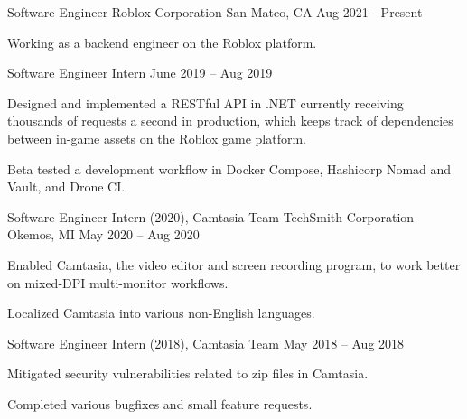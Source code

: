 \documentclass[]{awesome-cv}
\begin{document}
	\cventry
	{Software Engineer}
	{Roblox Corporation}
	{San Mateo, CA}
	{Aug 2021 - Present}
	{\begin{cvitems}
		\item{Working as a backend engineer on the Roblox platform.}
	\end{cvitems}}

	\vspace{-5mm}
	\cventry
	{Software Engineer Intern}
	{}
	{}
	{June 2019 – Aug 2019}
	{\begin{cvitems}
		\item {Designed and implemented a RESTful API in .NET currently receiving thousands of requests a second in production,
		 which keeps track of dependencies between in-game assets on the Roblox game platform.}
		\item {Beta tested a development workflow in Docker Compose, Hashicorp 
		Nomad and Vault, and Drone CI.}
	\end{cvitems}}

	\vspace{-4mm}
	\cventry
	{Software Engineer Intern (2020), Camtasia Team}
	{TechSmith Corporation}
	{Okemos, MI}
	{May 2020 – Aug 2020}
	{\begin{cvitems}
		\item {Enabled Camtasia, the video editor and screen recording program, to work better on mixed-DPI multi-monitor workflows.}
		\item {Localized Camtasia into various non-English languages.}
	\end{cvitems}}

	\vspace{-5mm}
	\cventry
	{Software Engineer Intern (2018), Camtasia Team}
	{}
	{}
	{May 2018 – Aug 2018}
	{\begin{cvitems}
		\item {Mitigated security vulnerabilities related to zip files in Camtasia.}
		\item {Completed various bugfixes and small feature requests.}
	\end{cvitems}}

\end{document}
